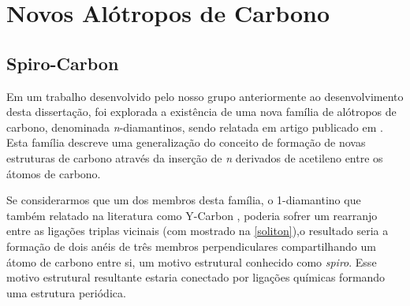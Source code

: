 

\chapter{Novos Alótropos de Carbono}
\label{chap:novos_alotropos}
\section{Spiro-Carbon}
\label{sec:spiro}

	Em um trabalho desenvolvido pelo nosso grupo anteriormente ao desenvolvimento desta dissertação, foi explorada a existência de uma nova família de alótropos de carbono, denominada \textit{n}-diamantinos, sendo relatada em artigo publicado em \citeyear{costa2018n} \cite{costa2018n}. Esta família descreve uma generalização do conceito de formação de novas estruturas de carbono através da inserção de \textit{n} derivados de acetileno entre os átomos de carbono. 
	
	Se considerarmos que um dos membros desta família, o 1-diamantino que também relatado na literatura como Y-Carbon \cite{jo2012carbon}, poderia sofrer um rearranjo entre as ligações triplas vicinais (com mostrado na \autoref{soliton}),o  resultado seria a formação de dois anéis de três membros perpendiculares compartilhando um átomo de carbono entre si, um motivo estrutural conhecido como \textit{spiro}. Esse motivo estrutural resultante estaria conectado por ligações químicas formando uma estrutura periódica.

